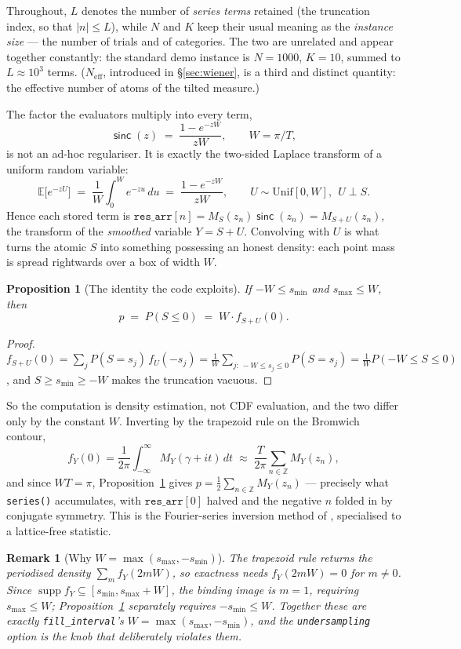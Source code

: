 \documentclass[11pt]{article}
\newtheorem{proposition}{Proposition}
\newtheorem{remark}{Remark}
\newcommand{\Neff}{N_{\mathrm{eff}}}
\newcommand{\sinck}{\operatorname{\mathsf{sinc}}}
\begin{document}
Throughout, $L$ denotes the number of \emph{series terms} retained (the truncation index, so that
$|n|\le L$), while $N$ and $K$ keep their usual meaning as the \emph{instance size} --- the number
of trials and of categories. The two are unrelated and appear together constantly: the standard demo
instance is $N=1000$, $K=10$, summed to $L\approx10^3$ terms. ($\Neff$, introduced in
\S\ref{sec:wiener}, is a third and distinct quantity: the effective number of atoms of the tilted
measure.)

The factor the evaluators multiply into every term,
\[
  \sinck(z)\;=\;\frac{1-e^{-zW}}{zW},\qquad W=\pi/T ,
\]
is not an ad-hoc regulariser. It is exactly the two-sided Laplace transform of a uniform random
variable:
\[
  \mathbb E\big[e^{-zU}\big]\;=\;\frac1W\int_0^W e^{-zu}\,du\;=\;\frac{1-e^{-zW}}{zW},
  \qquad U\sim\mathrm{Unif}[0,W],\ \ U\perp S .
\]
Hence each stored term is $\texttt{res\_arr}[n]=M_S(z_n)\sinck(z_n)=M_{S+U}(z_n)$, the transform of
the \emph{smoothed} variable $Y=S+U$. Convolving with $U$ is what turns the atomic $S$ into
something possessing an honest density: each point mass is spread rightwards over a box of width
$W$.

\begin{proposition}[The identity the code exploits]
\label{prop:identity}
If $-W\le s_{\min}$ and $s_{\max}\le W$, then
\[
  p\;=\;P(S\le 0)\;=\;W\cdot f_{S+U}(0).
\]
\end{proposition}
\begin{proof}
$f_{S+U}(0)=\sum_j P(S=s_j)\,f_U(-s_j)=\frac1W\sum_{j:\,-W\le s_j\le0}P(S=s_j)=\frac1W P(-W\le S\le0)$,
and $S\ge s_{\min}\ge-W$ makes the truncation vacuous.
\end{proof}

So the computation is density estimation, not CDF evaluation, and the two differ only by the
constant $W$. Inverting by the trapezoid rule on the Bromwich contour,
\[
  f_Y(0)=\frac1{2\pi}\int_{-\infty}^{\infty}\! M_Y(\gamma+it)\,dt
  \;\approx\;\frac{T}{2\pi}\sum_{n\in\mathbb Z}M_Y(z_n),
\]
and since $WT=\pi$, Proposition~\ref{prop:identity} gives
$p=\tfrac12\sum_{n\in\mathbb Z}M_Y(z_n)$ — precisely what \texttt{series()} accumulates, with
$\texttt{res\_arr}[0]$ halved and the negative $n$ folded in by conjugate symmetry. This is the
Fourier-series inversion method of \citet{abatewhitt1992}, specialised to a lattice-free statistic.

\begin{remark}[Why $W=\max(s_{\max},-s_{\min})$]
The trapezoid rule returns the \emph{periodised} density $\sum_m f_Y(2mW)$, so exactness needs
$f_Y(2mW)=0$ for $m\ne0$. Since $\operatorname{supp}f_Y\subseteq[s_{\min},s_{\max}+W]$, the binding
image is $m=1$, requiring $s_{\max}\le W$; Proposition~\ref{prop:identity} separately requires
$-s_{\min}\le W$. Together these are exactly \texttt{fill\_interval}'s
$W=\max(s_{\max},-s_{\min})$, and the \texttt{undersampling} option is the knob that deliberately
violates them.
\end{remark}
\end{document}
